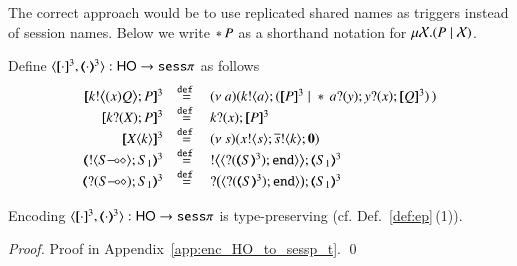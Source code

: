 The correct approach would be to use replicated shared names
as triggers instead of session names. 
Below we write $\ast\,{} P$ as a shorthand notation for $\mu \mathcal{X}. (P \;|\; \mathcal{X})$.

\begin{definition}\rm
	Define $\encod{\cdot}{\cdot}{3}: \HO \to \sesp$ as follows
	\[
	\begin{array}{rcl}
		\pmap{\bbout{k}{\abs{x} Q} P}{3} & \defeq &  \newsp{a}{\bout{k}{a} (\pmap{P}{3} \Par \repl{} \binp{a}{y} \binp{y}{x} \pmap{Q}{3})\,} \\
		\pmap{\binp{k}{X} P}{3} &\defeq&  \binp{k}{x} \pmap{P}{3}\\
		\pmap{\appl{X}{k}}{3} & \defeq & \newsp{s}{\bout{x}{s} \bout{\dual{s}}{k} \inact}\\
		\tmap{\btout{\lhot{S}}S_1}{3} & \defeq & \bbtout{\chtype{\btinp{\tmap{S}{3}}\tinact}}\tmap{S_1}{3} \\
		\tmap{\btinp{\lhot{S}}S_1}{3} & \defeq & \bbtinp{\chtype{\btinp{\tmap{S}{3}}\tinact}}\tmap{S_1}{3}
	\end{array}
	\]
\end{definition}

\begin{proposition}\rm
	Encoding $\encod{\cdot}{\cdot}{3}: \HO \to \sesp$  is type-preserving (cf. Def.~\ref{def:ep}\,(1)).
\end{proposition}

\begin{proof}
	Proof in Appendix~\ref{app:enc_HO_to_sessp_t}.
	\qed
\end{proof}

